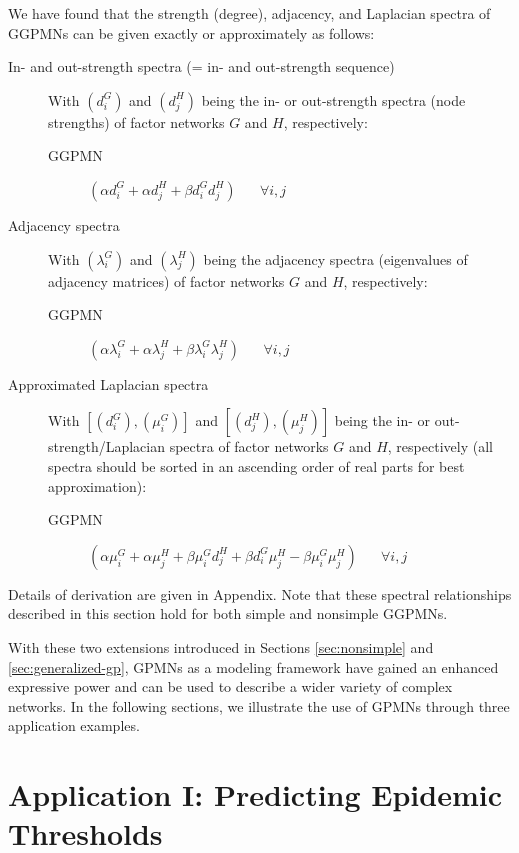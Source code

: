\documentclass{article}
\begin{document}
We have found that the strength (degree), adjacency, and Laplacian
spectra of GGPMNs can be given exactly or approximately as follows:
\begin{description}
\item[In- and out-strength spectra (= in- and out-strength sequence)]
  With $\left( d^G_i \right)$ and $\left( d^H_j \right)$ being the in-
  or out-strength spectra (node strengths) of factor networks $G$ and
  $H$, respectively:
\begin{description}
\item[GGPMN] $\left( \alpha d^G_i + \alpha d^H_j + \beta d^G_i d^H_j \right)$ ~~ $\forall i, j$
\end{description}
\item[Adjacency spectra] With $\left( \lambda^G_i \right)$ and $\left(
  \lambda^H_j \right)$ being the adjacency spectra (eigenvalues of
  adjacency matrices) of factor networks $G$ and $H$, respectively:
\begin{description}
\item[GGPMN] $\left( \alpha \lambda^G_i + \alpha \lambda^H_j + \beta \lambda^G_i \lambda^H_j \right)$
~~ $\forall i, j$
\end{description}
\item[Approximated Laplacian spectra] With $\left[\left(d^G_i\right),
  \left(\mu^G_i\right)\right]$ and $\left[\left(d^H_j\right),
  \left(\mu^H_j\right)\right]$ being the in- or out-strength/Laplacian
  spectra of factor networks $G$ and $H$, respectively (all spectra
  should be sorted in an ascending order of real parts for best
  approximation):
\begin{description}
\item[GGPMN] $\left( \alpha \mu^G_i + \alpha \mu^H_j + \beta \mu^G_i d^H_j + \beta d^G_i \mu^H_j - \beta \mu^G_i \mu^H_j \right)$ ~~ $\forall i, j$
\end{description}
\end{description}
Details of derivation are given in Appendix. Note that these spectral
relationships described in this section hold for both simple and
nonsimple GGPMNs.

With these two extensions introduced in Sections \ref{sec:nonsimple}
and \ref{sec:generalized-gp}, GPMNs as a modeling framework have
gained an enhanced expressive power and can be used to describe a
wider variety of complex networks. In the following sections, we
illustrate the use of GPMNs through three application examples.

\section{Application I: Predicting Epidemic Thresholds}
\label{sec:app1}
\end{document}
